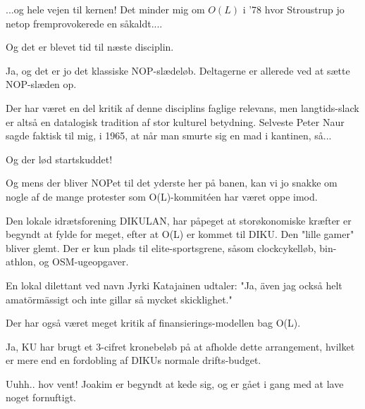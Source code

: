\documentclass[a4paper,11pt]{article}
\begin{document}
\begin{sketch}
   ...og hele vejen til kernen!  Det minder mig om $O(L)$ i
  '78 hvor Stroustrup jo netop fremprovokerede en såkaldt....


   Og det er blevet tid til næste disciplin.


   Ja, og det er jo det klassiske NOP-slædeløb.  Deltagerne
  er allerede ved at sætte NOP-slæden op.


   Der har været en del kritik af denne disciplins faglige
  relevans, men langtids-slack er altså en datalogisk tradition af
  stor kulturel betydning.  Selveste Peter Naur sagde faktisk til mig,
  i 1965, at når man smurte sig en mad i kantinen, så...


   Og der lød startskuddet!


   Og mens der bliver NOPet til det yderste her på banen, kan vi jo
  snakke om nogle af de mange protester som O(L)-kommitéen har været
  oppe imod.

   Den lokale idrætsforening DIKULAN, har påpeget at
  storøkonomiske kræfter er begyndt at fylde for meget, efter at O(L)
  er kommet til DIKU. Den "lille gamer" bliver glemt. Der er kun plads
  til elite-sportsgrene, såsom clockcykelløb, bin-athlon, og
  OSM-ugeopgaver.

   En lokal dilettant ved navn Jyrki Katajainen udtaler: "Ja, även
  jag också helt amatörmässigt och inte gillar så mycket skicklighet."


   Der har også været meget kritik af finansierings-modellen bag O(L).

   Ja, KU har brugt et 3-cifret kronebeløb på at afholde dette
  arrangement, hvilket er mere end en fordobling af DIKUs normale
  drifts-budget.


   Uuhh.. hov vent! Joakim er begyndt at kede sig, og er gået
  i gang med at lave noget fornuftigt.


\end{sketch}
\end{document}
